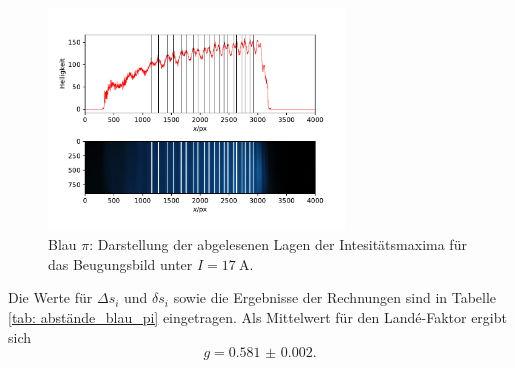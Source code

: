 \begin{figure}
  \centering
  \includegraphics[width = 0.7\textwidth]{../Messdaten/plots/peaks_blau_pi_17.pdf}
  \caption{Blau $\pi$: Darstellung der abgelesenen Lagen der Intesitätsmaxima für das Beugungsbild unter $I =\SI{17}{\ampere}$.}
  \label{fig: peaks_blau_pi_17}
\end{figure}
Die Werte für $\Delta s_i$ und $\delta s_i$ sowie die Ergebnisse der Rechnungen sind in Tabelle \ref{tab: abstände_blau_pi} eingetragen.
Als Mittelwert für den Landé-Faktor ergibt sich
\begin{equation}
  g = \num{0.581(2)}.
\end{equation}

